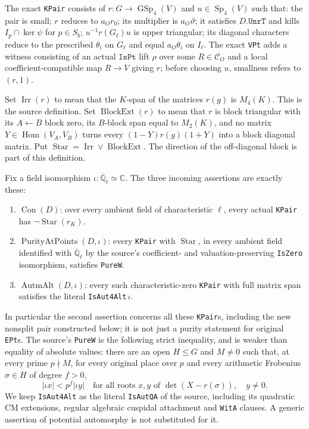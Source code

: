 The exact \texttt{KPair} consists of $r:G\to\operatorname{GSp}_4(V)$
and $u\in\operatorname{Sp}_4(V)$ such that:
the pair is small; $r$ reduces to $a_O r_0$;
its multiplier is $a_O\vartheta$; it satisfies
$D.\texttt{UnrT}$ and kills $I_p\cap\ker\psi$ for $p\in S_b$;
$u^{-1}r(G_\ell)u$ is upper triangular; its diagonal characters
reduce to the prescribed $\theta_i$ on $G_\ell$ and equal
$a_O\theta_i$ on $I_\ell$.
The exact \texttt{VPt} adds a witness consisting of an actual
$\texttt{IsPt}$ lift $\rho$ over some $R\in\mathcal C_O$ and a
local coefficient-compatible map $R\to V$ giving $r$; before
choosing $u$, smallness refers to $(r,1)$.

Set $\operatorname{Irr}(r)$ to mean that the $K$-span of the
matrices $r(g)$ is $M_4(K)$.  This is the source definition.
Set $\operatorname{BlockExt}(r)$ to mean that $r$ is block
triangular with its $A\leftarrow B$ block zero, its $B$-block
span equal to $M_2(K)$, and no matrix $Y\in\operatorname{Hom}(V_A,V_B)$
turns every $(1-Y)r(g)(1+Y)$ into a block diagonal matrix.
Put $\operatorname{Star}=\operatorname{Irr}\lor\operatorname{BlockExt}$.
The direction of the off-diagonal block is part of this definition.

Fix a field isomorphism
$\iota:\overline{\mathbb Q}_\ell\simeq\mathbb C$.
The three incoming assertions are exactly these:
\begin{enumerate}
\item $\operatorname{Con}(D)$: over every ambient field of
characteristic $\ell$, every actual \texttt{KPair} has
$\neg\operatorname{Star}(r_K)$.
\item $\operatorname{PurityAtPoints}(D,\iota)$: every
\texttt{KPair} with $\operatorname{Star}$, in every ambient
field identified with $\overline{\mathbb Q}_\ell$ by the
source's coefficient- and valuation-preserving
\texttt{IsZero} isomorphism, satisfies \texttt{PureW}.
\item $\operatorname{AutmAlt}(D,\iota)$: every such
characteristic-zero \texttt{KPair} with full matrix span
satisfies the literal \texttt{IsAut4Alt}$\,\iota$.
\end{enumerate}
In particular the second assertion concerns all these
\texttt{KPair}s, including the new nonsplit pair constructed
below; it is not just a purity statement for original
\texttt{EPt}s.  The source's \texttt{PureW} is the following
strict inequality, and is weaker than equality of absolute values:
there are an open $H\le G$ and $M\ne0$ such that, at every
prime $p\nmid M$, for every original place over $p$ and every
arithmetic Frobenius $\sigma\in H$ of degree $f>0$,
\[
 |\iota x|<p^f|\iota y|
 \quad\text{for all roots }x,y\text{ of }
                 \det(X-r(\sigma)),\quad y\ne0.
 \tag{IX.2}
\]
We keep \texttt{IsAut4Alt} as the literal \texttt{IsAutQA}
of the source, including its quadratic CM extensions,
regular algebraic cuspidal attachment and \texttt{WitA}
clauses.  A generic assertion of potential automorphy is
not substituted for it.

